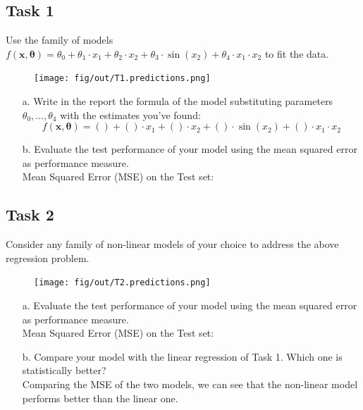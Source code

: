 \documentclass[tikz,14pt,fleqn]{article}
\begin{document}
\subsection{Task 1}
Use the family of models $f(\mathbf{x}, \boldsymbol{\theta}) = \theta_0 + \theta_1 \cdot x_1 + \theta_2 \cdot x_2 + \theta_3 \cdot \sin(x_2) + \theta_4 \cdot x_1 \cdot x_2$ to fit the data. 
\begin{figure}
    \centering
    \texttt{[image: fig/out/T1.predictions.png]}
    \vspace{-1.35cm}
    \label{fig:1.1}
\end{figure}
\begin{itemize}
	\item [a.] Write in the report the formula of the model substituting parameters $\theta_0, \ldots, \theta_4$ with the estimates you've found:
	$$f(\mathbf{x}, \boldsymbol{\theta}) = () + () \cdot x_1 + () \cdot x_2 + () \cdot \sin(x_2) + () \cdot x_1 \cdot x_2$$
	\item [b.] Evaluate the test performance of your model using the mean squared error as performance measure.\\
	Mean Squared Error (MSE) on the Test set: 
\end{itemize}
\subsection{Task 2}
Consider any family of non-linear models of your choice to address the above regression problem.
\begin{figure}
    \centering
    \texttt{[image: fig/out/T2.predictions.png]}
    \vspace{-1.7cm}
    \label{fig:1.1}
\end{figure}
\begin{itemize}
	\item [a.] Evaluate the test performance of your model using the mean squared error as performance measure.\\
    Mean Squared Error (MSE) on the Test set: 
	\item [b.] Compare your model with the linear regression of Task 1. Which one is {statistically} better? \\
	Comparing the MSE of the two models, we can see that the non-linear model performs better than the linear one. %
\end{itemize}
\end{document}
